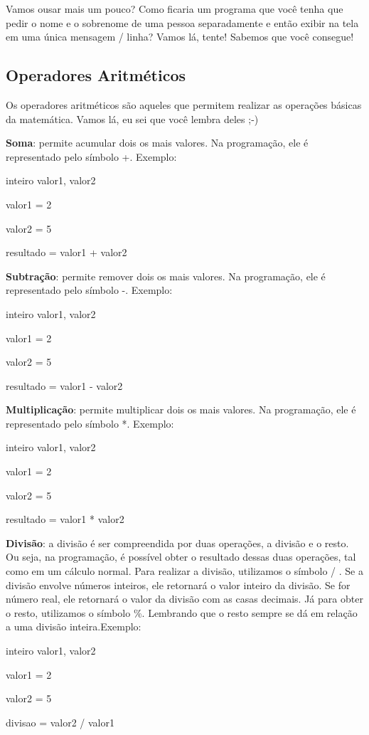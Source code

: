 \documentclass{article}
\begin{document}
Vamos ousar mais um pouco? Como ficaria um programa que você tenha que pedir o nome e o sobrenome de uma pessoa separadamente e então exibir na tela em uma única mensagem / linha? Vamos lá, tente! Sabemos que você consegue!

\subsection{Operadores Aritméticos}
Os operadores aritméticos são aqueles que permitem realizar as operações básicas da matemática. Vamos lá, eu sei que você lembra deles ;-)


\textbf{Soma}: permite acumular dois os mais valores. Na programação, ele é representado pelo símbolo +. Exemplo:

inteiro valor1, valor2

valor1 = 2

valor2 = 5

resultado = valor1 + valor2

\textbf{Subtração}: permite remover dois os mais valores. Na programação, ele é representado pelo símbolo -. Exemplo:

inteiro valor1, valor2

valor1 = 2

valor2 = 5

resultado = valor1 - valor2

\textbf{Multiplicação}: permite multiplicar dois os mais valores. Na programação, ele é representado pelo símbolo *. Exemplo:

inteiro valor1, valor2

valor1 = 2

valor2 = 5

resultado = valor1 * valor2

\textbf{Divisão}: a divisão é ser compreendida por duas operações, a divisão e o resto. Ou seja, na programação, é possível obter o resultado dessas duas operações, tal como em um cálculo normal. Para realizar a divisão, utilizamos o símbolo / . Se a divisão envolve números inteiros, ele retornará o valor inteiro da divisão. Se for número real, ele retornará o valor da divisão com as casas decimais. Já para obter o resto, utilizamos o símbolo \%. Lembrando que o resto sempre se dá em relação a uma divisão inteira.Exemplo:

inteiro valor1, valor2

valor1 = 2

valor2 = 5

divisao = valor2 / valor1
\end{document}

